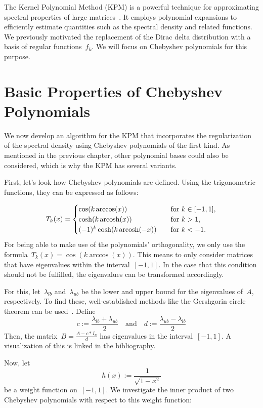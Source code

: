 The Kernel Polynomial Method (KPM) is a powerful technique for approximating spectral properties of large matrices~\cite{weisse2006,linsaadyang14}. It employs polynomial expansions to efficiently estimate quantities such as the spectral density and related functions. We previously motivated the replacement of the Dirac delta distribution with a basis of regular functions~$f_k$. We will focus on Chebyshev polynomials for this purpose.

\section{Basic Properties of Chebyshev Polynomials}
We now develop an algorithm for the KPM that incorporates the regularization of the spectral density using Chebyshev polynomials of the first kind. As mentioned in the previous chapter, other polynomial bases could also be considered, which is why the KPM has several variants.

First, let's look how Chebyshev polynomials are defined. Using the trigonometric functions, they can be expressed as follows:

\[ T_k(x) =
\begin{cases}
\cos(k \arccos(x))                & \quad \text{for } k \in [-1, 1],\\
    \cosh(k \operatorname{arcosh}(x))           & \quad \text{for } k > 1,\\
    (-1)^k \cosh(k \operatorname{arcosh}(-x))   & \quad \text{for } k < -1.
\end{cases}
\]
For being able to make use of the polynomials' orthogonality, we only use the formula~$T_k(x) = \cos(k \arccos(x))$. This means to only consider matrices that have eigenvalues within the interval~$[-1, 1]$. In the case that this condition should not be fulfilled, the eigenvalues can be transformed accordingly.

For this, let~$\lambda_{lb}$ and~$\lambda_{ub}$ be the lower and upper bound for the eigenvalues of~$A$, respectively. To find these, well-established methods like the Gershgorin circle theorem can be used~\cite{hornjohnson2013}. Define
\[
c := \frac{\lambda_{lb} + \lambda_{ub}}{2} \quad \text{and} \quad d := \frac{\lambda_{ub} - \lambda_{lb}}{2}
\]
Then, the matrix~$B = \frac{A - c*I_n}{d}$ has eigenvalues in the interval~$[-1, 1]$. A visualization of this is linked in the bibliography.

Now, let
\[
h(x) := \frac{1}{\sqrt{1 - x^2}}
\]
be a weight function on~$[-1, 1]$. We investigate the inner product of two Chebyshev polynomials with respect to this weight function:

